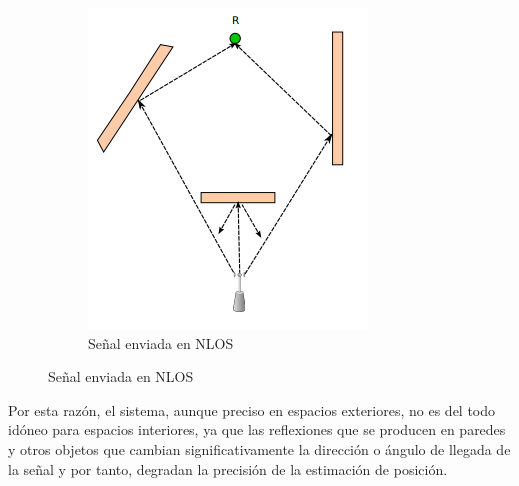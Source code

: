 \begin{enumerate}
{\begin{figure}[h!]
\begin{subfigure}[b]{0.315\textwidth}
             \includegraphics[width=\textwidth]{./images/nlos}
                \caption{Señal enviada en \ac{NLOS}}
                \label{fig:NLOS}
            \end{subfigure}
        \end{figure}
        
                \clearpage 

        
        Por esta razón, el sistema, aunque preciso en espacios exteriores, no es del todo idóneo para espacios interiores, ya que las reflexiones que se producen en paredes y otros objetos que cambian significativamente la dirección o ángulo de llegada de la señal y por tanto, degradan la precisión de la estimación de posición.
        
}
\end{enumerate}
